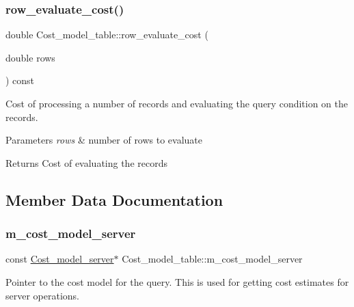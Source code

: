 \subsubsection{\texorpdfstring{row\+\_\+evaluate\+\_\+cost()}{row\_evaluate\_cost()}}
{\footnotesize\ttfamily double Cost\+\_\+model\+\_\+table\+::row\+\_\+evaluate\+\_\+cost (\begin{DoxyParamCaption}\item[{double}]{rows }\end{DoxyParamCaption}) const\hspace{0.3cm}{\ttfamily [inline]}}

Cost of processing a number of records and evaluating the query condition on the records.


\begin{DoxyParams}{Parameters}
{\em rows} & number of rows to evaluate\\
\hline
\end{DoxyParams}
\begin{DoxyReturn}{Returns}
Cost of evaluating the records 
\end{DoxyReturn}


\subsection{Member Data Documentation}
\mbox{\label{classCost__model__table_a36e50fb6e4c0eb9944f08bb1cd14b24a}} 
\subsubsection{\texorpdfstring{m\+\_\+cost\+\_\+model\+\_\+server}{m\_cost\_model\_server}}
{\footnotesize\ttfamily const \mbox{\hyperlink{classCost__model__server}{Cost\+\_\+model\+\_\+server}}$\ast$ Cost\+\_\+model\+\_\+table\+::m\+\_\+cost\+\_\+model\+\_\+server\hspace{0.3cm}{\ttfamily [protected]}}

Pointer to the cost model for the query. This is used for getting cost estimates for server operations. \mbox{\label{classCost__model__table_ac97e7bdd7006a4d6f6e2353866b3317d}} 
